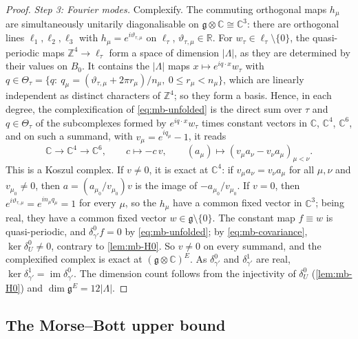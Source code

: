 \documentclass[11pt,a4paper]{amsart}
\theoremstyle{definition}
\theoremstyle{remark}
\numberwithin{equation}{section}
\newcommand{\R}{\mathbb{R}}          %
\newcommand{\C}{\mathbb{C}}          %
\newcommand{\Z}{\mathbb{Z}}          %
\newcommand{\abs}[1]{\lvert #1\rvert}      %
\begin{document}
\begin{proof}
\emph{Step 3: Fourier modes.} Complexify. The commuting orthogonal maps $h_\mu$ are simultaneously unitarily diagonalisable on $\mathfrak g\otimes\C\cong\C^3$: there are orthogonal lines $\ell_1,\ell_2,\ell_3$ with $h_\mu=e^{i\vartheta_{\tau,\mu}}$ on $\ell_\tau$, $\vartheta_{\tau,\mu}\in\R$. For $w_\tau\in\ell_\tau\setminus\{0\}$, the quasi-periodic maps $\Z^4\to\ell_\tau$ form a space of dimension $\abs\Lambda$, as they are determined by their values on $B_0$. It contains the $\abs\Lambda$ maps $x\mapsto e^{iq\cdot x}w_\tau$ with $q\in\Theta_\tau=\{q:\ q_\mu=(\vartheta_{\tau,\mu}+2\pi r_\mu)/n_\mu,\ 0\le r_\mu<n_\mu\}$, which are linearly independent as distinct characters of $\Z^4$; so they form a basis. Hence, in each degree, the complexification of \eqref{eq:mb-unfolded} is the direct sum over $\tau$ and $q\in\Theta_\tau$ of the subcomplexes formed by $e^{iq\cdot x}w_\tau$ times constant vectors in $\C$, $\C^4$, $\C^6$, and on such a summand, with $v_\mu=e^{iq_\mu}-1$, it reads
\begin{equation}\label{eq:mb-koszul}
\C\longrightarrow\C^4\longrightarrow\C^6,\qquad c\longmapsto-c\,v,\qquad(a_\mu)\longmapsto(v_\mu a_\nu-v_\nu a_\mu)_{\mu<\nu}.
\end{equation}
This is a Koszul complex. If $v\ne0$, it is exact at $\C^4$: if $v_\mu a_\nu=v_\nu a_\mu$ for all $\mu,\nu$ and $v_{\mu_0}\ne0$, then $a=(a_{\mu_0}/v_{\mu_0})v$ is the image of $-a_{\mu_0}/v_{\mu_0}$. If $v=0$, then $e^{i\vartheta_{\tau,\mu}}=e^{in_\mu q_\mu}=1$ for every $\mu$, so the $h_\mu$ have a common fixed vector in $\C^3$; being real, they have a common fixed vector $w\in\mathfrak g\setminus\{0\}$. The constant map $f\equiv w$ is quasi-periodic, and $\delta^0_{\gamma'}f=0$ by \eqref{eq:mb-unfolded}; by \eqref{eq:mb-covariance}, $\ker\delta^0_U\ne0$, contrary to \cref{lem:mb-H0}. So $v\ne0$ on every summand, and the complexified complex is exact at $(\mathfrak g\otimes\C)^E$. As $\delta^0_{\gamma'}$ and $\delta^1_{\gamma'}$ are real, $\ker\delta^1_{\gamma'}=\operatorname{im}\delta^0_{\gamma'}$. The dimension count follows from the injectivity of $\delta^0_U$ (\cref{lem:mb-H0}) and $\dim\mathfrak g^E=12\abs\Lambda$.
\end{proof}

\subsection{The Morse--Bott upper bound}
\end{document}
